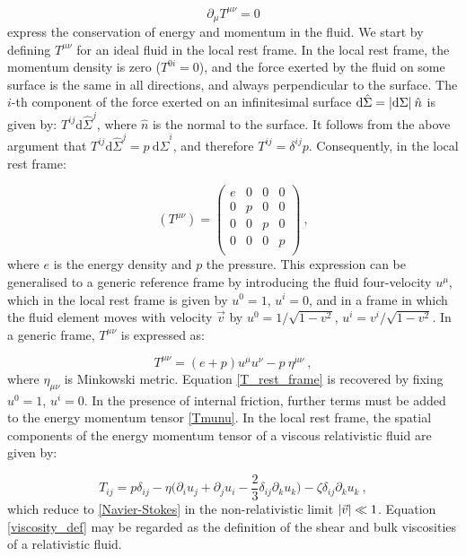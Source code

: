 \begin{equation}
\partial_{\mu} T^{\mu\nu} = 0
\end{equation}
%
express the conservation of energy and momentum in the fluid.
We start by defining $T^{\mu\nu}$ for an ideal fluid in the local rest frame. In the local rest frame, the momentum density is zero ($T^{0i} = 0$), and the force exerted by the fluid on some surface is the same in all directions, and always perpendicular to the surface. The $i$-th component of the force exerted on an infinitesimal surface $\mathrm{d} \hat \Sigma = \abs{\mathrm{d}\Sigma} \: \hat n$ is given by:  $T^{ij} \mathrm{d} \hat \Sigma^j $, where $\hat n$ is the normal to the surface. It follows from the above argument that $T^{ij} \mathrm{d} \hat \Sigma^j = p \: \mathrm{d} \hat \Sigma^i $, and therefore $T^{ij} = \delta^{ij} p$. Consequently, in the local rest frame:
 
 
 \begin{equation}
 (T^{\mu\nu}) =
 \begin{pmatrix}
 e & 0 & 0 & 0 \\
 0 & p & 0 & 0 \\
 0 & 0 & p & 0 \\
 0 & 0 & 0 & p \\
 \end{pmatrix} \: ,
 \label{T_rest_frame}
 \end{equation}
 where $e$ is the energy density and $p$ the pressure.
 This expression can be generalised to a generic reference frame by introducing the fluid four-velocity $u^{\mu}$, which in the local rest frame is given by $u^0 =1$, $u^i =0$, and in a frame in which the fluid element moves with velocity $\vec v$ by $u^0 = 1/\sqrt{1-v^2}$, $u^i = v^i/\sqrt{1-v^2}$. In a generic frame, $T^{\mu\nu}$ is expressed as:
 
 \begin{equation}
 T^{\mu\nu} = (e+p) u^{\mu} u^{\nu} - p \: \eta^{\mu\nu} \: ,
 \label{Tmunu}
 \end{equation}
 where $\eta_{\mu\nu}$ is Minkowski metric. Equation \ref{T_rest_frame} is recovered by fixing $u^0 =1$, $u^i =0$.
In the presence of internal friction, further terms must be added to the energy momentum tensor \ref{Tmunu}. In the local rest frame, the spatial components of the energy momentum tensor of a viscous relativistic fluid are given by:

\begin{equation}
T_{ij} = p \delta_{ij} - \eta \biggl( \partial_i u_j +\partial_j u_i - \frac{2}{3} \delta_{ij} \partial_k u_k \biggr) - \zeta \delta_{ij} \partial_k u_k \: ,
\label{viscosity_def}
\end{equation}
%
which reduce to \ref{Navier-Stokes} in the non-relativistic limit $\abs{\vec v} \ll 1$. Equation \ref{viscosity_def} may be regarded as the definition of the shear and bulk viscosities of a relativistic fluid.
 

